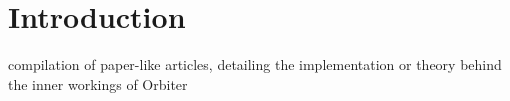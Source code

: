 \documentclass[Orbiter Technical Reference.tex]{subfiles}
\begin{document}
\section{Introduction}

compilation of paper-like articles, detailing the implementation or theory behind the inner workings of Orbiter
\end{document}
